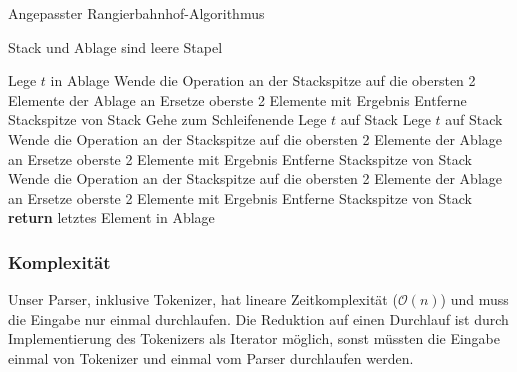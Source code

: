 \begin{algorithm}
\caption{Angepasster Rangierbahnhof-Algorithmus}
\label{alg:shunt}
\begin{algorithmic}
\State Stack und Ablage sind leere Stapel

    \State Lege $t$ in Ablage
            \State Wende die Operation an der Stackspitze
            \State \quad auf die obersten 2 Elemente der Ablage an
            \State Ersetze oberste 2 Elemente mit Ergebnis
            \State Entferne Stackspitze von Stack
        \Else
            \State Gehe zum Schleifenende
        \EndIf
    \EndWhile
    \State Lege $t$ auf Stack
    \State Lege $t$ auf Stack
        \State Wende die Operation an der Stackspitze
        \State \quad auf die obersten 2 Elemente der Ablage an
        \State Ersetze oberste 2 Elemente mit Ergebnis
        \State Entferne Stackspitze von Stack
    \EndWhile
\EndIf
\EndFor
{}
    \State Wende die Operation an der Stackspitze
    \State \quad auf die obersten 2 Elemente der Ablage an
    \State Ersetze oberste 2 Elemente mit Ergebnis
    \State Entferne Stackspitze von Stack
\EndWhile
\State \textbf{return} letztes Element in Ablage
\end{algorithmic}
\end{algorithm}

\subsubsection{Komplexität}

Unser Parser, inklusive Tokenizer, hat lineare Zeitkomplexität ($\mathcal{O}(n)$) und muss die Eingabe nur einmal durchlaufen. Die Reduktion auf einen Durchlauf ist durch Implementierung des Tokenizers als Iterator möglich, sonst müssten die Eingabe einmal von Tokenizer und einmal vom Parser durchlaufen werden.
